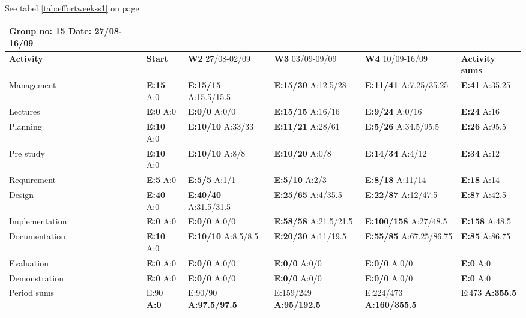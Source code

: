 See tabel \ref{tab:effortweekss1} on page \pageref{tab:effortweekss1}
\begin{table}
\begin{tabularx}{\linewidth}{>{\setlength\hsize{.625\hsize}}X|>{\setlength\hsize{0.3\hsize}}X|>{\setlength\hsize{0.5\hsize}}X|>{\setlength\hsize{0.5\hsize}}X|>{\setlength\hsize{0.5\hsize}}X|>{\setlength\hsize{.3\hsize}}X}
Group no: 15 Date: 27/08-16/09  \\ \hline
\textbf{Activity} & \textbf{Start} & \textbf{W2} 27/08-02/09 & \textbf{W3} 03/09-09/09 & \textbf{W4} 10/09-16/09 & \textbf{Activity sums} \\ \hline \hline
Management & \textbf{E:15} A:0 & \textbf{E:15/15} A:15.5/15.5 & \textbf{E:15/30} A:12.5/28 & \textbf{E:11/41} A:7.25/35.25 & \textbf{E:41} A:35.25  \\ \hline
Lectures & \textbf{E:0} A:0 & \textbf{E:0/0} A:0/0 & \textbf{E:15/15} A:16/16 & \textbf{E:9/24} A:0/16 & \textbf{E:24 } A:16  \\ \hline
Planning & \textbf{E:10} A:0 & \textbf{E:10/10} A:33/33 & \textbf{E:11/21} A:28/61 & \textbf{E:5/26} A:34.5/95.5 & \textbf{E:26 } A:95.5  \\ \hline
Pre study & \textbf{E:10} A:0 & \textbf{E:10/10} A:8/8 & \textbf{E:10/20} A:0/8 & \textbf{E:14/34} A:4/12 & \textbf{E:34 } A:12  \\ \hline
Requirement & \textbf{E:5} A:0 & \textbf{E:5/5} A:1/1 & \textbf{E:5/10} A:2/3 & \textbf{E:8/18} A:11/14 & \textbf{E:18 } A:14  \\ \hline
Design & \textbf{E:40} A:0 & \textbf{E:40/40} A:31.5/31.5 & \textbf{E:25/65} A:4/35.5 & \textbf{E:22/87} A:12/47.5 & \textbf{E:87 } A:42.5  \\ \hline
Implementation & \textbf{E:0} A:0 & \textbf{E:0/0} A:0/0 & \textbf{E:58/58} A:21.5/21.5 & \textbf{E:100/158} A:27/48.5 & \textbf{E:158 } A:48.5  \\ \hline
Documentation & \textbf{E:10} A:0 & \textbf{E:10/10} A:8.5/8.5 & \textbf{E:20/30} A:11/19.5 & \textbf{E:55/85} A:67.25/86.75 & \textbf{E:85 } A:86.75  \\ \hline
Evaluation & \textbf{E:0} A:0 & \textbf{E:0/0} A:0/0 & \textbf{E:0/0} A:0/0 & \textbf{E:0/0} A:0/0 & \textbf{E:0 } A:0  \\ \hline
Demonstration & \textbf{E:0} A:0 & \textbf{E:0/0} A:0/0 & \textbf{E:0/0} A:0/0 & \textbf{E:0/0} A:0/0 & \textbf{E:0 } A:0  \\ \hline
Period sums & E:90 \textbf{A:0} & E:90/90 \textbf{A:97.5/97.5} & E:159/249 \textbf{A:95/192.5} & E:224/473 \textbf{A:160/355.5} & E:473 \textbf{A:355.5}
\end{tabularx}


\end{table}
